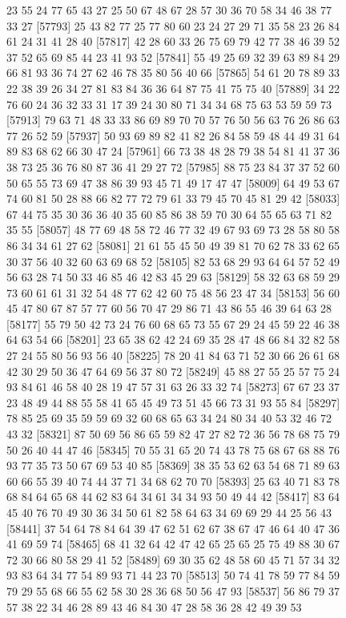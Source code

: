 \documentclass{article}
\begin{document}
\begin{figure}[H]
\begin{Schunk}
\begin{Soutput}
[57769] 23 55 24 77 65 43 27 25 50 67 48 67 28 57 30 36 70 58 34 46 38 77 33 27
[57793] 25 43 82 77 25 77 80 60 23 24 27 29 71 35 58 23 26 84 61 24 31 41 28 40
[57817] 42 28 60 33 26 75 69 79 42 77 38 46 39 52 37 52 65 69 85 44 23 41 93 52
[57841] 55 49 25 69 32 39 63 89 84 29 66 81 93 36 74 27 62 46 78 35 80 56 40 66
[57865] 54 61 20 78 89 33 22 38 39 26 34 27 81 83 84 36 36 64 87 75 41 75 75 40
[57889] 34 22 76 60 24 36 32 33 31 17 39 24 30 80 71 34 34 68 75 63 53 59 59 73
[57913] 79 63 71 48 33 33 86 69 89 70 70 57 76 50 56 63 76 26 86 63 77 26 52 59
[57937] 50 93 69 89 82 41 82 26 84 58 59 48 44 49 31 64 89 83 68 62 66 30 47 24
[57961] 66 73 38 48 28 79 38 54 81 41 37 36 38 73 25 36 76 80 87 36 41 29 27 72
[57985] 88 75 23 84 37 37 52 60 50 65 55 73 69 47 38 86 39 93 45 71 49 17 47 47
[58009] 64 49 53 67 74 60 81 50 28 88 66 82 77 72 79 61 33 79 45 70 45 81 29 42
[58033] 67 44 75 35 30 36 36 40 35 60 85 86 38 59 70 30 64 55 65 63 71 82 35 55
[58057] 48 77 69 48 58 72 46 77 32 49 67 93 69 73 28 58 80 58 86 34 34 61 27 62
[58081] 21 61 55 45 50 49 39 81 70 62 78 33 62 65 30 37 56 40 32 60 63 69 68 52
[58105] 82 53 68 29 93 64 64 57 52 49 56 63 28 74 50 33 46 85 46 42 83 45 29 63
[58129] 58 32 63 68 59 29 73 60 61 61 31 32 54 48 77 62 42 60 75 48 56 23 47 34
[58153] 56 60 45 47 80 67 87 57 77 60 56 70 47 29 86 71 43 86 55 46 39 64 63 28
[58177] 55 79 50 42 73 24 76 60 68 65 73 55 67 29 24 45 59 22 46 38 64 63 54 66
[58201] 23 65 38 62 42 24 69 35 28 47 48 66 84 32 82 58 27 24 55 80 56 93 56 40
[58225] 78 20 41 84 63 71 52 30 66 26 61 68 42 30 29 50 36 47 64 69 56 37 80 72
[58249] 45 88 27 55 25 57 75 24 93 84 61 46 58 40 28 19 47 57 31 63 26 33 32 74
[58273] 67 67 23 37 23 48 49 44 88 55 58 41 65 45 49 73 51 45 66 73 31 93 55 84
[58297] 78 85 25 69 35 59 59 69 32 60 68 65 63 34 24 80 34 40 53 32 46 72 43 32
[58321] 87 50 69 56 86 65 59 82 47 27 82 72 36 56 78 68 75 79 50 26 40 44 47 46
[58345] 70 55 31 65 20 74 43 78 75 68 67 68 88 76 93 77 35 73 50 67 69 53 40 85
[58369] 38 35 53 62 63 54 68 71 89 63 60 66 55 39 40 74 44 37 71 34 68 62 70 70
[58393] 25 63 40 71 83 78 68 84 64 65 68 44 62 83 64 34 61 34 34 93 50 49 44 42
[58417] 83 64 45 40 76 70 49 30 36 34 50 61 82 58 64 63 34 69 69 29 44 25 56 43
[58441] 37 54 64 78 84 64 39 47 62 51 62 67 38 67 47 46 64 40 47 36 41 69 59 74
[58465] 68 41 32 64 42 47 42 65 25 65 25 75 49 88 30 67 72 30 66 80 58 29 41 52
[58489] 69 30 35 62 48 58 60 45 71 57 34 32 93 83 64 34 77 54 89 93 71 44 23 70
[58513] 50 74 41 78 59 77 84 59 79 29 55 68 66 55 62 58 30 28 36 68 50 56 47 93
[58537] 56 86 79 37 57 38 22 34 46 28 89 43 46 84 30 47 28 58 36 28 42 49 39 53

\end{Soutput}
\end{Schunk}
\end{figure}
\end{document}
